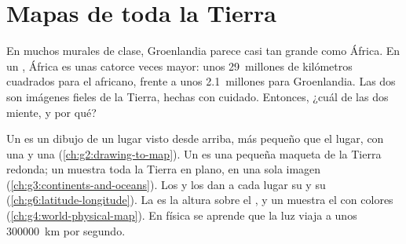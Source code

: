 \chapter{Mapas de toda la Tierra}\label{ch:g9:maps-of-the-earth}

En muchos  murales de clase, Groenlandia parece casi tan grande como
África. En un , África es unas catorce veces mayor: unos
29~millones de kilómetros cuadrados para el  africano, frente a
unos 2.1~millones para Groenlandia. Las dos son imágenes fieles de la
Tierra, hechas con cuidado. Entonces, ¿cuál de las dos miente, y por qué?

\begin{recall}
Un  es un dibujo de un lugar visto desde arriba, más pequeño que el
lugar, con una  y una  (\cref{ch:g2:drawing-to-map}). Un  es una pequeña maqueta de la Tierra redonda; un  muestra
toda la Tierra en plano, en una sola imagen
(\cref{ch:g3:continents-and-oceans}). Los  y los  dan a
cada lugar su  y su  (\cref{ch:g6:latitude-longitude}). La
 es la altura sobre el , y un  muestra el
 con colores (\cref{ch:g4:world-physical-map}). En física se aprende
que la luz viaja a unos \qty{300000}{km} por segundo.
\end{recall}

